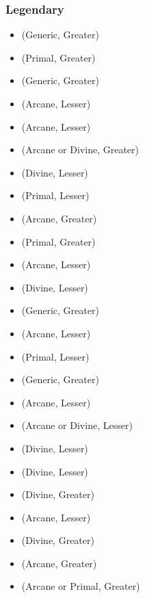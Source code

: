 \subsubsection{Legendary}
\begin{itemize}
	\item {} (Generic, Greater)
	\item {} (Primal, Greater)
	\item {} (Generic, Greater)
	\item {} (Arcane, Lesser) 
	\item {} (Arcane, Lesser)
	\item {} (Arcane or Divine, Greater)
	\item {} (Divine, Lesser)
	\item {} (Primal, Lesser)
	\item {} (Arcane, Greater)
	\item {} (Primal, Greater)
	\item {} (Arcane, Lesser)
	\item {} (Divine, Lesser)
	\item {} (Generic, Greater)
	\item {} (Arcane, Lesser)
	\item {} (Primal, Lesser)
	\item {} (Generic, Greater)
	\item {} (Arcane, Lesser)
	\item {} (Arcane or Divine, Lesser)
	\item {} (Divine, Lesser)
	\item {} (Divine, Lesser)
	\item {} (Divine, Greater)
	\item {} (Arcane, Lesser)
	\item {} (Divine, Greater)
	\item {} (Arcane, Greater)
	\item {} (Arcane or Primal, Greater)

\end{itemize}
